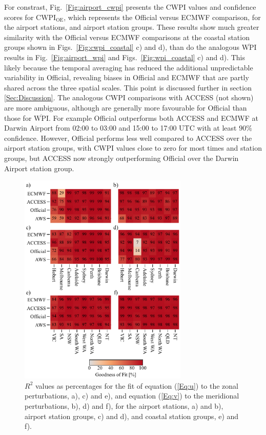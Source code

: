 \documentclass[twocol]{ametsoc}
\begin{document}
For constrast, Fig.~\ref{Fig:airport_cwpi} presents the CWPI values and confidence scores for $\text{CWPI}_\text{OE}$, which represents the Official versus ECMWF comparison, for the airport stations, and airport station groups. These results show much greater similarity with the Official versus ECMWF comparisons at the coastal station groups shown in Figs.~\ref{Fig:cwpi_coastal} c) and d), than do the analogous $\overline{\text{WPI}}$ results in Fig.~\ref{Fig:airport_wpi} and Figs.~\ref{Fig:wpi_coastal} c) and d). This likely because the temporal averaging has reduced the additional unpredictable variability in Official, revealing biases in Official and ECMWF that are partly shared across the three spatial scales. This point is discussed further in section \ref{Sec:Discussion}. The analogous CWPI comparisons with ACCESS (not shown) are more ambiguous, although are generally more favourable for Official than those for $\overline{\text{WPI}}$. For example Official outperforms both ACCESS and ECMWF at Darwin Airport from 02:00 to 03:00 and 15:00 to 17:00 UTC with at least $90\%$ confidence. However, Official performs less well compared to ACCESS over the airport station groups, with CWPI values close to zero for most times and station groups, but ACCESS now strongly outperforming Official over the Darwin Airport station group.  

\begin{figure}
\centering
\includegraphics[width=19pc]{r_squared.pdf}
\caption{$R^2$ values as percentages for the fit of equation (\ref{Eq:u}) to the zonal perturbations, a), c) and e), and equation (\ref{Eq:v}) to the meridional perturbations, b), d) and f), for the airport stations, a) and b), airport station groups, c) and d), and coastal station groups, e) and f).}
\label{Fig:r_squared}
\end{figure}
\end{document}
